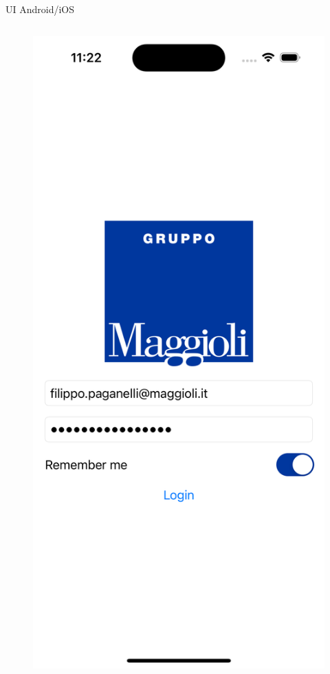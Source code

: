 \begin{frame}{UI Android/iOS}
\begin{columns}[onlytextwidth]
\begin{column}{0.14\textwidth}
        \end{column}
    \end{columns}
    \begin{columns}[onlytextwidth]
        \begin{column}{0.14\textwidth}
        
            \begin{figure}[H]
                \includegraphics[width=1\textwidth]{img/login_ios.png}
            \end{figure}
            

\end{column}
\end{columns}
\end{frame}
